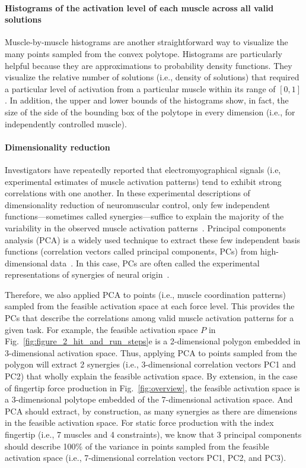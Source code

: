 \documentclass[9pt,twocolumn,twoside,lineno]{pnas-new}
\begin{document}
{\paragraph*{Histograms of the activation level of each muscle across all valid solutions}

Muscle-by-muscle histograms are another straightforward way to visualize the many points sampled from the convex polytope. Histograms are particularly helpful because they are approximations to probability density functions.
They visualize the relative number of solutions (i.e., density of solutions) that required a particular level of activation from a particular muscle within its range of $[0,1]$.
In addition, the upper and lower bounds of the histograms show, in fact, the size of the side of the bounding box of the polytope in every dimension (i.e., for independently controlled muscle).

\paragraph*{Dimensionality reduction}

Investigators have repeatedly reported that electromyographical signals (i.e, experimental estimates of muscle activation patterns) tend to exhibit strong correlations with one another.
In these experimental descriptions of dimensionality reduction of neuromuscular control, only few independent functions---sometimes called synergies---suffice to explain the majority of the variability in the observed muscle activation patterns~\cite{kutch2012challenges,steele2013number,bizzi2013neural,dingwell2010walkingvariability,steele2015consequences,alessandro2013musclesynergies,krishnamoorthy2003muscle}.
Principal components analysis (PCA) is a widely used technique to extract these few independent basis functions (correlation vectors called principal components, PCs) from high-dimensional data~\cite{Clewley2008Estimating}.
In this case, PCs are often called the experimental representations of synergies of neural origin~\cite{kutch2012challenges}.

Therefore, we also applied PCA to points (i.e., muscle coordination patterns) sampled from the feasible activation space at each force level.
This provides the PCs that describe the correlations among valid muscle activation patterns for a given task.
For example, the feasible activation space $P$ in Fig.~\ref{fig:figure_2_hit_and_run_steps}e is a 2-dimensional polygon embedded in 3-dimensional activation space. Thus, applying PCA to points sampled from the polygon will extract 2 synergies (i.e., 3-dimensional correlation vectors PC1 and PC2) that wholly explain the feasible activation space. By extension, in the case of fingertip force production in Fig.~\ref{fig:overview}, the feasible activation space is a 3-dimensional polytope embedded of the 7-dimensional activation space. And PCA should extract, by construction, as many synergies as there are dimensions in the feasible activation space. For static force production with the index fingertip (i.e., 7 muscles and 4 constraints), we know that 3 principal components should describe 100\% of the variance in points sampled from the feasible activation space (i.e., 7-dimensional correlation vectors PC1, PC2, and PC3).

}
\end{document}
